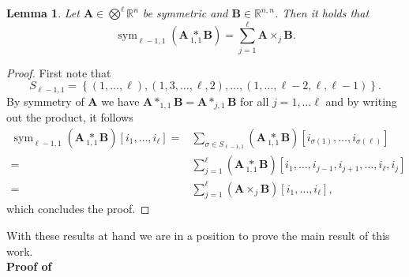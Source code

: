 \documentclass[11pt,reqno]{amsart}
\numberwithin{equation}{section}
\theoremstyle{plain}
\newtheorem{lemma}{Lemma}
\newcommand{\R}{\mathbb{R}}
\DeclareMathOperator{\Sym}{sym}
\newcommand{\tenp}[2]{\underset{#1,#2}{*}}
\begin{document}
\begin{lemma}\label{LEM:HigherDerivativesCalculations2}
  Let $\mathbf{A}\in \bigotimes^\ell\R^n$ be symmetric and $\mathbf{B} \in \R^{n,n}$. Then it holds that
  \begin{equation*}
      \Sym_{\ell-1,1}\left( \mathbf{A} \tenp{1}{1} \mathbf{B} \right) = \sum_{j=1}^{\ell} \mathbf{A} \times_j \mathbf{B}.
  \end{equation*}
\end{lemma}
\begin{proof}
  First note that
  \[
    S_{\ell-1,1}= \left\{ (1,\dots,\ell),(1,3,\dots,\ell,2),\dots,(1,\dots,\ell-2,\ell,\ell-1) \right\}.
  \]
 By symmetry of $\mathbf{A}$ we have $\mathbf{A}*_{1,1}\mathbf{B}=\mathbf{A}*_{j,1}\mathbf{B}$ for all $j=1,\dots \ell$ and by writing out the product, it follows
\begin{align*}
    \Sym_{\ell-1,1}\left( \mathbf{A} \tenp{1}{1} \mathbf{B} \right)[i_1,\dots,i_\ell] =&  \sum_{\sigma\in S_{\ell-1,1}} \left( \mathbf{A} \tenp{1}{1} \mathbf{B} \right)[i_{\sigma(1)},\dots,i_{\sigma(\ell)}] \\
    =& \sum_{j=1}^{\ell}\left( \mathbf{A} \tenp{1}{1} \mathbf{B} \right)[i_1,\dots,i_{j-1},i_{j+1},\dots,i_\ell,i_j]\\
    =& \sum_{j=1}^{\ell} \left(\mathbf{A} \times_j \mathbf{B} \right)[i_1,\dots,i_\ell],
\end{align*}
which concludes the proof.
\end{proof}
%
With these results at hand we are in a position to prove the main result of this work.\\ 
%
\textbf{Proof of }
%
\end{document}

